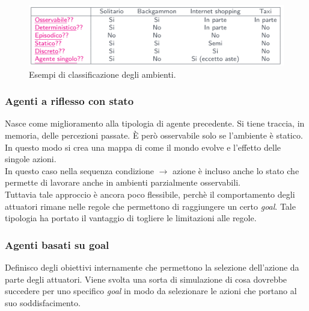 \documentclass[10pt,a4paper]{book}
\begin{document}
\begin{figure}[H]
\centering
  \includegraphics[width=1\linewidth]{./images/esempi-ambiente.png}
  \caption{Esempi di classificazione degli ambienti.}
   \label{fig: esempi-ambiente}
\end{figure}
\noindent

\subsubsection{Agenti a riflesso con stato}
Nasce come miglioramento alla tipologia di agente precedente. Si tiene traccia, in memoria, delle percezioni passate. \`E per\`o osservabile solo se l'ambiente \`e statico. In questo modo si crea una mappa di come il mondo evolve e l'effetto delle singole azioni.\\
In questo caso nella sequenza condizione $\rightarrow$ azione \`e incluso anche lo stato che permette di lavorare anche in ambienti parzialmente osservabili.\\
Tuttavia tale approccio \`e ancora poco flessibile, perch\`e il comportamento degli attuatori rimane nelle regole che permettono di raggiungere un certo \textit{goal}. Tale tipologia ha portato il vantaggio di togliere le limitazioni alle regole.
\subsubsection{Agenti basati su goal}
Definisco degli obiettivi internamente che permettono la selezione dell'azione da parte degli attuatori. Viene svolta una sorta di simulazione di cosa dovrebbe succedere per uno specifico \textit{goal} in modo da selezionare le azioni che portano al suo soddisfacimento.
\end{document}
